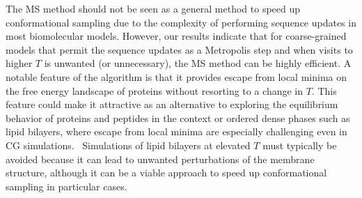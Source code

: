 \documentclass[%
 aip,
rsi,%
 amsmath,amssymb,
 reprint,%
]{revtex4-1}
\newcommand {\sigE}	{{\sigma_{\left < E \right >}}}
\newcommand {\SR}		{${\mathrm{S16}_{144}}$}
\begin{document}
The MS method should not be seen as a general method to speed up conformational sampling due to the complexity of performing sequence updates in most biomolecular models. However, our results indicate that for coarse-grained models that permit the sequence updates as a Metropolis step and when visits to higher $T$ is unwanted (or unnecessary), the MS method can be highly efficient. A notable feature of the algorithm is that it provides escape from local minima on the free energy landscape of proteins without resorting to a change in $T$. This feature could make it attractive as an alternative to exploring the equilibrium behavior of proteins and peptides in the context or ordered dense phases such as lipid bilayers, where escape from local minima are especially challenging even in CG simulations.~\cite{Bereau2015} Simulations of lipid bilayers at elevated $T$ must typically be avoided because it can lead to unwanted perturbations of the membrane structure, although it can be a viable approach to speed up conformational sampling in particular cases.~\cite{Ulmschneider2010} 



\end{document}
